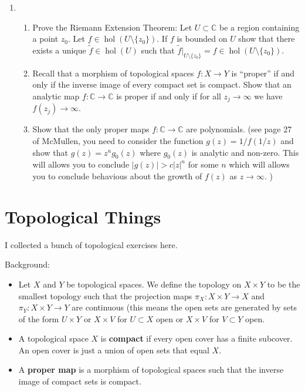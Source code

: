 \documentclass[a4paper,10pt]{article}
\newcommand{\CC}{\mathbb{C}}
\newcommand{\hol}{\operatorname{hol}}
\begin{document}
\begin{enumerate}
	\item 
\begin{enumerate}
	\item Prove the Riemann Extension Theorem: Let $U\subset \CC$ be a region containing a point $z_0$. 
	Let $f \in \hol(U\setminus \lbrace z_0 \rbrace)$.
	If $f$ is bounded on $U$ show that there exists a unique $\widetilde{f} \in \hol(U)$ such that $\widetilde{f}\vert_{U \setminus \lbrace z_0 \rbrace} = f \in \hol(U \setminus \lbrace z_0 \rbrace )$.
	\item Recall that a morphism of topological spaces $f: X \to Y$ is ``proper'' if and only if the inverse image of every compact set is compact. 
	Show that an analytic map $f:\CC \to \CC$ is proper if and only if for all $z_j \to \infty$ we have $f(z_j) \to \infty$. 
	\item Show that the only proper maps $f:\CC \to \CC$ are polynomials. (see page 27 of McMullen, you need to consider the function $g(z) = 1/f(1/z)$ and show that $g(z) = z^n g_0(z)$ where $g_0(z)$ is analytic and non-zero. This will allows you to conclude $\vert g(z) \vert > c\vert z \vert^n$ for some $n$ which will allows you to conclude behavious about the growth of $f(z)$ as $z \to \infty$. )
\end{enumerate}
\end{enumerate}


\newpage
\section{Topological Things}
I collected a bunch of topological exercises here. 

	Background: 
\begin{itemize}
	\item Let $X$ and $Y$ be topological spaces. We define the topology on $X\times Y$ to be the smallest topology such that the projection maps $\pi_X: X \times Y \to X$ and $\pi_Y: X\times Y \to Y$ are continuous (this means the open sets are generated by sets of the form $U \times Y$ or $X\times V$ for $U\subset X$ open or $X \times V$ for $V\subset Y$ open. 
	\item A topological space $X$ is \textbf{compact} if every open cover has a finite subcover. An open cover is just a union of open sets that equal $X$.
	\item A \textbf{proper map} is a morphism of topological spaces such that the inverse image of compact sets is compact. 
\end{itemize}
\end{document}
